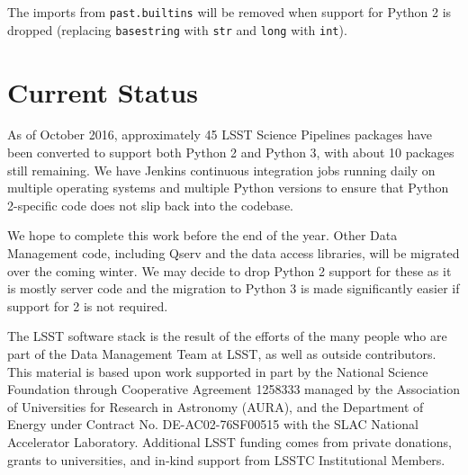 \documentclass[11pt,twoside]{article}
\begin{document}
The imports from \texttt{past.builtins} will be removed when support for Python 2 is dropped (replacing \texttt{basestring} with \texttt{str} and \texttt{long} with \texttt{int}).

\section{Current Status}

As of October 2016, approximately 45 LSST Science Pipelines packages have been converted to support both Python 2 and Python 3, with about 10 packages still remaining.
We have Jenkins continuous integration jobs running daily on multiple operating systems and multiple Python versions to ensure that Python 2-specific code does not slip back into the codebase.

We hope to complete this work before the end of the year.
Other Data Management code, including Qserv and the data access libraries, will be migrated over the coming winter.
We may decide to drop Python 2 support for these as it is mostly server code and the migration to Python 3 is made significantly easier if support for 2 is not required.

\acknowledgements The LSST software stack is the result of the efforts of the many people who are part of the Data Management Team at LSST, as well as outside contributors.
This material is based upon work supported in part by the National Science Foundation through Cooperative Agreement 1258333 managed by the Association of Universities for Research in Astronomy (AURA), and the Department of Energy under Contract No. DE-AC02-76SF00515 with the SLAC National Accelerator Laboratory. Additional LSST funding comes from private donations, grants to universities, and in‐kind support from LSSTC Institutional Members.

\end{document}
